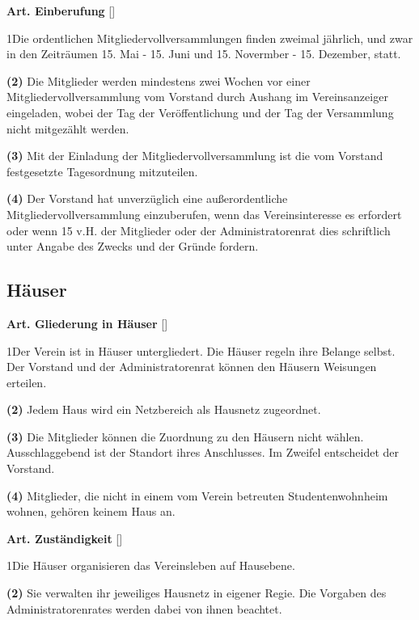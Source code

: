 \documentclass[12pt]{article}
\newcommand{\UAbschnitt}[1]{\subsection{#1}}
\newcommand{\Satz}[2]{

\begin{samepage}
{\bf (#1)} #2
\end{samepage}
}
\newenvironment{Artikel}[2]{
\bigskip \centerline{{\bf Art. #1} [#2]}
\nopagebreak
}{
}
\begin{document}
\begin{Artikel}{16}{Einberufung}

\Satz{1}{Die ordentlichen Mitgliedervollversammlungen finden zweimal jährlich,
und zwar in den Zeiträumen 15. Mai - 15. Juni und 15. Novermber - 15. Dezember, statt.}

\Satz{2}{Die Mitglieder werden mindestens zwei Wochen vor einer
Mitgliedervollversammlung vom Vorstand durch Aushang im Vereinsanzeiger
eingeladen, wobei der Tag der Ver\-öffent\-lichung und der Tag der Versammlung
nicht mitgezählt werden.}

\Satz{3}{Mit der Einladung der Mitgliedervollversammlung ist die vom Vorstand
festgesetzte Tagesordnung mitzuteilen.}

\Satz{4}{Der Vorstand hat unverzüglich  eine außerordentliche
Mitgliedervollversammlung einzuberufen, wenn das Vereinsinteresse es erfordert
oder wenn 15 v.H. der Mitglieder oder der Administratorenrat dies schriftlich
unter Angabe des Zwecks und der Gründe fordern.}

\end{Artikel}

\UAbschnitt{Häuser} 

\begin{Artikel}{17}{Gliederung in Häuser}

\Satz{1}{Der Verein ist in Häuser untergliedert. Die Häuser regeln ihre Belange
selbst. Der Vorstand und der Administratorenrat können den Häusern Weisungen
erteilen.}

\Satz{2}{Jedem Haus wird ein Netzbereich als Hausnetz zugeordnet.}

\Satz{3}{Die Mitglieder können die Zuordnung zu den Häusern nicht wählen. 
Ausschlaggebend ist der Standort ihres Anschlusses. Im Zweifel entscheidet der
Vorstand.}

\Satz{4}{Mitglieder, die nicht in einem vom Verein betreuten Studentenwohnheim
wohnen, gehören keinem Haus an.}

\end{Artikel}

\begin{Artikel}{18}{Zuständigkeit}

\Satz{1}{Die Häuser organisieren das Vereinsleben auf Hausebene.}

\Satz{2}{Sie verwalten ihr jeweiliges Hausnetz in eigener Regie. Die Vorgaben
des Administratorenrates werden dabei von ihnen beachtet.}

\end{Artikel}
\end{document}
